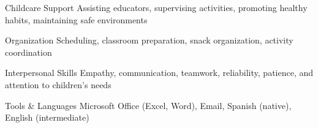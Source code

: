 \begin{cvskills}

  \cvskill
  {Childcare Support}
  {Assisting educators, supervising activities, promoting healthy habits, maintaining safe environments}

  \cvskill
  {Organization}
  {Scheduling, classroom preparation, snack organization, activity coordination}

  \cvskill
  {Interpersonal Skills}
  {Empathy, communication, teamwork, reliability, patience, and attention to children's needs}

  \cvskill
  {Tools \& Languages}
  {Microsoft Office (Excel, Word), Email, Spanish (native), English (intermediate)}

\end{cvskills}
